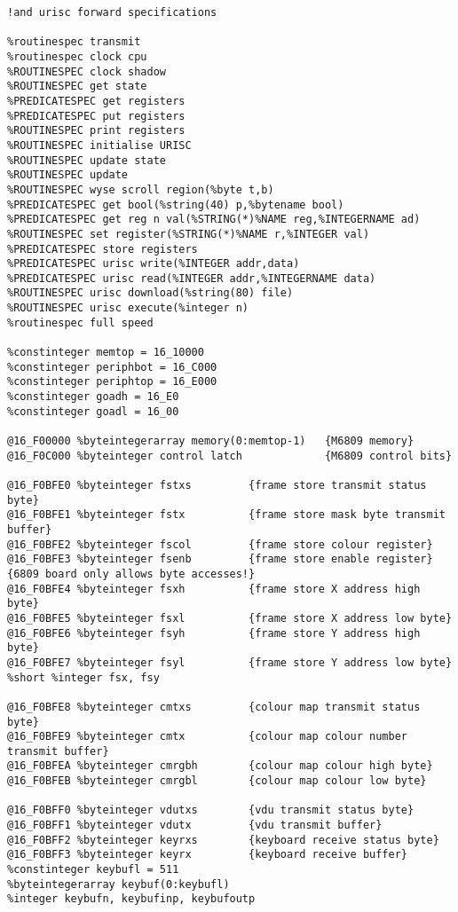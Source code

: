 \begin{verbatim}
!and urisc forward specifications

%routinespec transmit
%routinespec clock cpu
%ROUTINESPEC clock shadow
%ROUTINESPEC get state
%PREDICATESPEC get registers
%PREDICATESPEC put registers
%ROUTINESPEC print registers
%ROUTINESPEC initialise URISC
%ROUTINESPEC update state
%ROUTINESPEC update
%ROUTINESPEC wyse scroll region(%byte t,b)
%PREDICATESPEC get bool(%string(40) p,%bytename bool)
%PREDICATESPEC get reg n val(%STRING(*)%NAME reg,%INTEGERNAME ad)
%ROUTINESPEC set register(%STRING(*)%NAME r,%INTEGER val)
%PREDICATESPEC store registers
%PREDICATESPEC urisc write(%INTEGER addr,data)
%PREDICATESPEC urisc read(%INTEGER addr,%INTEGERNAME data)
%ROUTINESPEC urisc download(%string(80) file)
%ROUTINESPEC urisc execute(%integer n)
%routinespec full speed

%constinteger memtop = 16_10000
%constinteger periphbot = 16_C000
%constinteger periphtop = 16_E000
%constinteger goadh = 16_E0
%constinteger goadl = 16_00

@16_F00000 %byteintegerarray memory(0:memtop-1)   {M6809 memory}
@16_F0C000 %byteinteger control latch             {M6809 control bits}

@16_F0BFE0 %byteinteger fstxs         {frame store transmit status byte}
@16_F0BFE1 %byteinteger fstx          {frame store mask byte transmit buffer}
@16_F0BFE2 %byteinteger fscol         {frame store colour register}
@16_F0BFE3 %byteinteger fsenb         {frame store enable register}
{6809 board only allows byte accesses!}
@16_F0BFE4 %byteinteger fsxh          {frame store X address high byte}
@16_F0BFE5 %byteinteger fsxl          {frame store X address low byte}
@16_F0BFE6 %byteinteger fsyh          {frame store Y address high byte}
@16_F0BFE7 %byteinteger fsyl          {frame store Y address low byte}
%short %integer fsx, fsy

@16_F0BFE8 %byteinteger cmtxs         {colour map transmit status byte}
@16_F0BFE9 %byteinteger cmtx          {colour map colour number transmit buffer}
@16_F0BFEA %byteinteger cmrgbh        {colour map colour high byte}
@16_F0BFEB %byteinteger cmrgbl        {colour map colour low byte}

@16_F0BFF0 %byteinteger vdutxs        {vdu transmit status byte}
@16_F0BFF1 %byteinteger vdutx         {vdu transmit buffer}
@16_F0BFF2 %byteinteger keyrxs        {keyboard receive status byte}
@16_F0BFF3 %byteinteger keyrx         {keyboard receive buffer}
%constinteger keybufl = 511
%byteintegerarray keybuf(0:keybufl)
%integer keybufn, keybufinp, keybufoutp


\end{verbatim}
